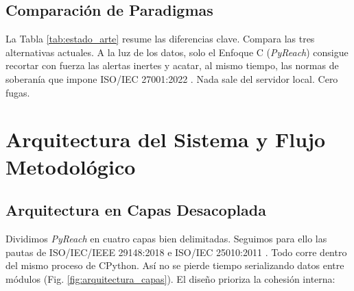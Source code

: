 \documentclass[conference]{IEEEtran}
\begin{document}
\subsection{Comparación de Paradigmas}
La Tabla \ref{tab:estado_arte} resume las diferencias clave. Compara las tres alternativas actuales. A la luz de los datos, solo el Enfoque C (\textit{PyReach}) consigue recortar con fuerza las alertas inertes y acatar, al mismo tiempo, las normas de soberanía que impone ISO/IEC 27001:2022 \cite{iso2022sec, ladisa2023sok, gutierrez2024auditoria}. Nada sale del servidor local. Cero fugas.

\section{Arquitectura del Sistema y Flujo Metodológico}

\subsection{Arquitectura en Capas Desacoplada}
Dividimos \textit{PyReach} en cuatro capas bien delimitadas. Seguimos para ello las pautas de ISO/IEC/IEEE 29148:2018 \cite{iso2018req} e ISO/IEC 25010:2011 \cite{iso2011sqa}. Todo corre dentro del mismo proceso de CPython. Así no se pierde tiempo serializando datos entre módulos (Fig. \ref{fig:arquitectura_capas}). El diseño prioriza la cohesión interna:
\end{document}
